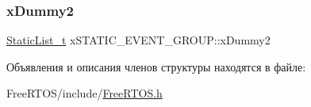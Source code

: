 \subsubsection{\texorpdfstring{xDummy2}{xDummy2}}
{\footnotesize\ttfamily \mbox{\hyperlink{_free_r_t_o_s_8h_a9735ad9101a2bd25f83a62089a4acee6}{Static\+List\+\_\+t}} x\+S\+T\+A\+T\+I\+C\+\_\+\+E\+V\+E\+N\+T\+\_\+\+G\+R\+O\+U\+P\+::x\+Dummy2}



Объявления и описания членов структуры находятся в файле\+:\begin{DoxyCompactItemize}
\item 
Free\+R\+T\+O\+S/include/\mbox{\hyperlink{_free_r_t_o_s_8h}{Free\+R\+T\+O\+S.\+h}}\end{DoxyCompactItemize}
